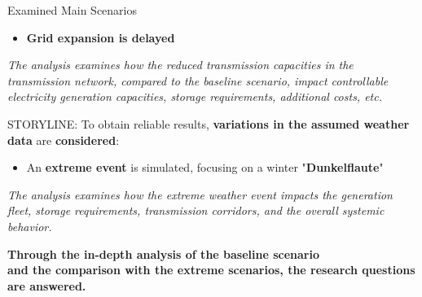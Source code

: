 \documentclass[aspectratio=169]{beamer}
\begin{document}
\begin{frame}{Examined Main Scenarios}
\begin{minipage}[t][12.9cm]{\textwidth}
\begin{minipage}[t]{0.325\textwidth}
\begin{coloredblock}
\begin{minipage}[t][2.5cm]{0.9\textwidth}
\begin{itemize}
                        \item \scriptsize \textbf{Grid expansion is delayed}
                    \end{itemize}
                \end{minipage}
                \begin{minipage}[t][3.7cm]{0.9\textwidth} 
                    \scriptsize \textit{The analysis examines how the reduced transmission capacities in the transmission network, compared to the baseline scenario, impact controllable electricity generation capacities, storage requirements, additional costs, etc.}
                \end{minipage}
            \end{coloredblock}
        \end{minipage}
        \hfill
        \begin{minipage}[t]{0.325\textwidth}
            \begin{coloredblock}
                \begin{minipage}[t][3cm]{0.9\textwidth} 
                    \scriptsize STORYLINE: To obtain reliable results, \textbf{variations in the assumed weather data} are \textbf{considered}:
                \end{minipage}
                \begin{minipage}[t][2.5cm]{0.9\textwidth}
                    \begin{itemize}
                        \item \scriptsize An \textbf{extreme event} is simulated, focusing on a winter "\textbf{Dunkelflaute}"
                    \end{itemize}
                \end{minipage}
                \begin{minipage}[t][3.7cm]{0.9\textwidth} 
                    \scriptsize \textit{The analysis examines how the extreme weather event impacts the generation fleet, storage requirements, transmission corridors, and the overall systemic behavior.}
                \end{minipage}
            \end{coloredblock}
        \end{minipage}
        
    \end{minipage}

    \begin{coloredblock}[grey]
        \centering
        \footnotesize\textbf{Through the in-depth analysis of the baseline scenario \\
        and the comparison with the extreme scenarios, the research questions are answered.}
    \end{coloredblock}

\end{frame}
\end{document}
